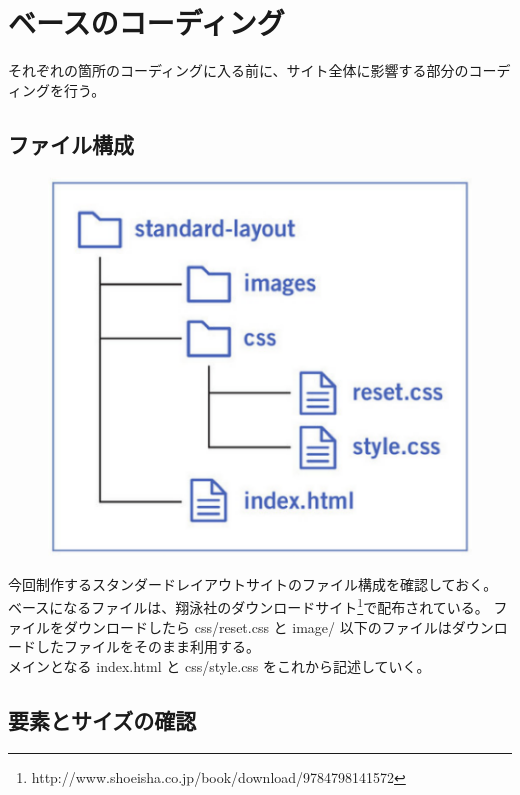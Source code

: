 \chapter{ベースのコーディング}
それぞれの箇所のコーディングに入る前に、サイト全体に影響する部分のコーディングを行う。
\section{ファイル構成}
\begin{figure}
  \vspace*{-\intextsep}
  \includegraphics[width=19.00zw]{./PART2/Fig/Fig01_03.PNG}
\end{figure}
今回制作するスタンダードレイアウトサイトのファイル構成を確認しておく。
ベースになるファイルは、翔泳社のダウンロードサイト\footnote{http://www.shoeisha.co.jp/book/download/9784798141572}で配布されている。
ファイルをダウンロードしたら css/reset.css と image/ 以下のファイルはダウンロードしたファイルをそのまま利用する。\\

メインとなる index.html と css/style.css をこれから記述していく。
\section{要素とサイズの確認}
